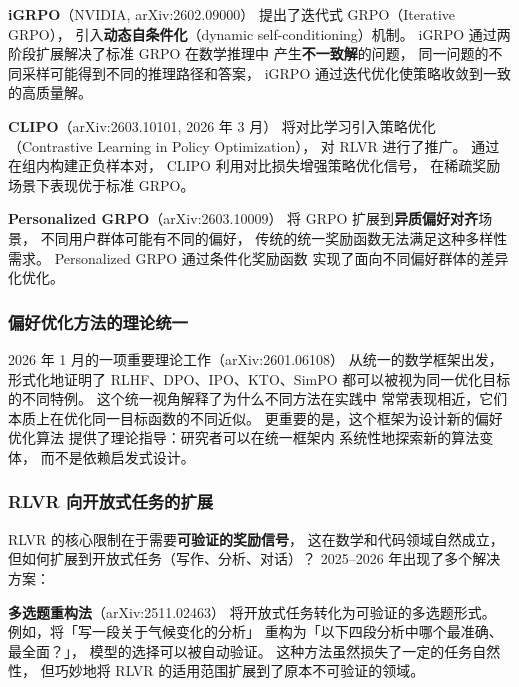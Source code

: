 
\textbf{iGRPO}（NVIDIA, arXiv:2602.09000）
提出了迭代式 GRPO（Iterative GRPO），
引入\textbf{动态自条件化}（dynamic self-conditioning）机制。
iGRPO 通过两阶段扩展解决了标准 GRPO 在数学推理中
产生\textbf{不一致解}的问题，
同一问题的不同采样可能得到不同的推理路径和答案，
iGRPO 通过迭代优化使策略收敛到一致的高质量解。


\textbf{CLIPO}（arXiv:2603.10101, 2026 年 3 月）
将对比学习引入策略优化（Contrastive Learning in Policy Optimization），
对 RLVR 进行了推广。
通过在组内构建正负样本对，
CLIPO 利用对比损失增强策略优化信号，
在稀疏奖励场景下表现优于标准 GRPO。


\textbf{Personalized GRPO}（arXiv:2603.10009）
将 GRPO 扩展到\textbf{异质偏好对齐}场景，
不同用户群体可能有不同的偏好，
传统的统一奖励函数无法满足这种多样性需求。
Personalized GRPO 通过条件化奖励函数
实现了面向不同偏好群体的差异化优化。

\subsubsection{偏好优化方法的理论统一}


2026 年 1 月的一项重要理论工作（arXiv:2601.06108）
从统一的数学框架出发，
形式化地证明了 RLHF、DPO、IPO、KTO、SimPO
都可以被视为同一优化目标的不同特例。
这个统一视角解释了为什么不同方法在实践中
常常表现相近，它们本质上在优化同一目标函数的不同近似。
更重要的是，这个框架为设计新的偏好优化算法
提供了理论指导：研究者可以在统一框架内
系统性地探索新的算法变体，
而不是依赖启发式设计。

\subsubsection{RLVR 向开放式任务的扩展}

RLVR 的核心限制在于需要\textbf{可验证的奖励信号}，
这在数学和代码领域自然成立，
但如何扩展到开放式任务（写作、分析、对话）？
2025--2026 年出现了多个解决方案：

\textbf{多选题重构法}（arXiv:2511.02463）
将开放式任务转化为可验证的多选题形式。
例如，将「写一段关于气候变化的分析」
重构为「以下四段分析中哪个最准确、最全面？」，
模型的选择可以被自动验证。
这种方法虽然损失了一定的任务自然性，
但巧妙地将 RLVR 的适用范围扩展到了原本不可验证的领域。


